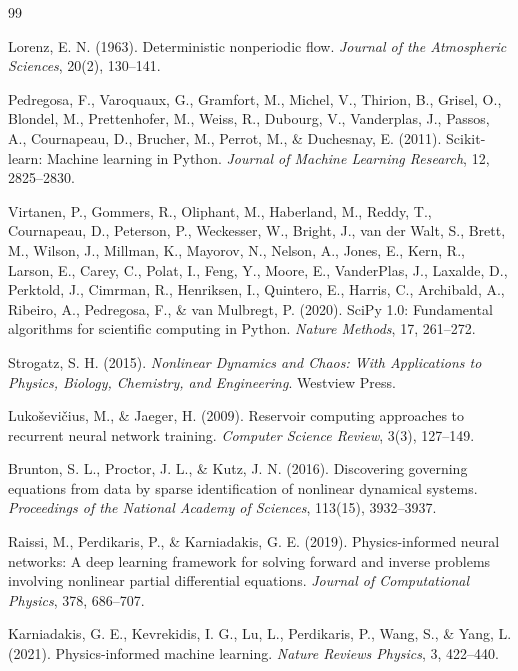 \documentclass[UTF8,a4paper,12pt]{ctexart}
\begin{document}
\begin{thebibliography}{99}

Lorenz, E. N. (1963).
Deterministic nonperiodic flow.
\textit{Journal of the Atmospheric Sciences}, 20(2), 130--141.

Pedregosa, F., Varoquaux, G., Gramfort, M., Michel, V., Thirion, B., Grisel, O., Blondel, M., Prettenhofer, M., Weiss, R., Dubourg, V., Vanderplas, J., Passos, A., Cournapeau, D., Brucher, M., Perrot, M., \& Duchesnay, E. (2011).
Scikit-learn: Machine learning in Python.
\textit{Journal of Machine Learning Research}, 12, 2825--2830.

Virtanen, P., Gommers, R., Oliphant, M., Haberland, M., Reddy, T., Cournapeau, D., Peterson, P., Weckesser, W., Bright, J., van der Walt, S., Brett, M., Wilson, J., Millman, K., Mayorov, N., Nelson, A., Jones, E., Kern, R., Larson, E., Carey, C., Polat, I., Feng, Y., Moore, E., VanderPlas, J., Laxalde, D., Perktold, J., Cimrman, R., Henriksen, I., Quintero, E., Harris, C., Archibald, A., Ribeiro, A., Pedregosa, F., \& van Mulbregt, P. (2020).
SciPy 1.0: Fundamental algorithms for scientific computing in Python.
\textit{Nature Methods}, 17, 261--272.

Strogatz, S. H. (2015).
\textit{Nonlinear Dynamics and Chaos: With Applications to Physics, Biology, Chemistry, and Engineering}.
Westview Press.

Luko\v{s}evi\v{c}ius, M., \& Jaeger, H. (2009).
Reservoir computing approaches to recurrent neural network training.
\textit{Computer Science Review}, 3(3), 127--149.

Brunton, S. L., Proctor, J. L., \& Kutz, J. N. (2016).
Discovering governing equations from data by sparse identification of nonlinear dynamical systems.
\textit{Proceedings of the National Academy of Sciences}, 113(15), 3932--3937.

Raissi, M., Perdikaris, P., \& Karniadakis, G. E. (2019).
Physics-informed neural networks: A deep learning framework for solving forward and inverse problems involving nonlinear partial differential equations.
\textit{Journal of Computational Physics}, 378, 686--707.

Karniadakis, G. E., Kevrekidis, I. G., Lu, L., Perdikaris, P., Wang, S., \& Yang, L. (2021).
Physics-informed machine learning.
\textit{Nature Reviews Physics}, 3, 422--440.

\end{thebibliography}
\end{document}
